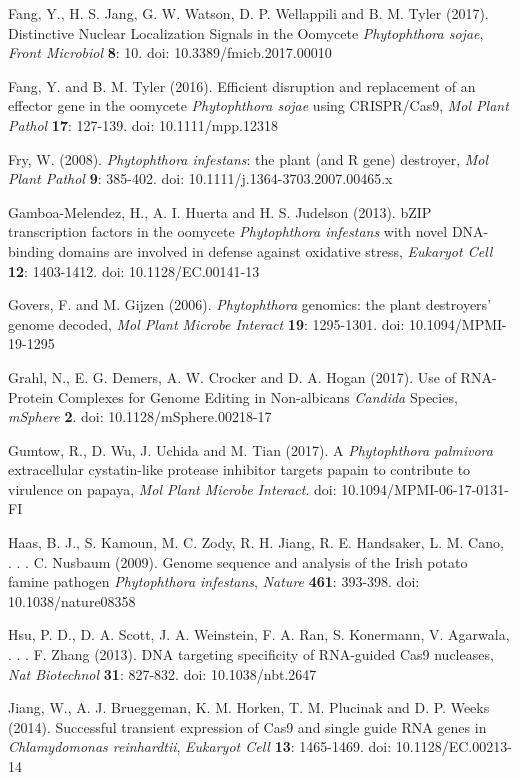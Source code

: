 \documentclass[onecolumn, 11pt,openany]{memoir}
\begin{document}
\begin{multicols}{2}
\begin{sloppy}
\begin{footnotesize}
Fang, Y., H. S. Jang, G. W. Watson, D. P. Wellappili and B. M. Tyler (2017). Distinctive Nuclear Localization Signals in the Oomycete \textit{Phytophthora sojae}, \textit{Front Microbiol} \textbf{8}: 10. doi: 10.3389/fmicb.2017.00010

Fang, Y. and B. M. Tyler (2016). Efficient disruption and replacement of an effector gene in the oomycete \textit{Phytophthora sojae} using CRISPR/Cas9, \textit{Mol Plant Pathol} \textbf{17}: 127-139. doi: 10.1111/mpp.12318

Fry, W. (2008). \textit{Phytophthora infestans}: the plant (and R gene) destroyer, \textit{Mol Plant Pathol} \textbf{9}: 385-402. doi: 10.1111/j.1364-3703.2007.00465.x

Gamboa-Melendez, H., A. I. Huerta and H. S. Judelson (2013). bZIP transcription factors in the oomycete \textit{Phytophthora infestans} with novel DNA-binding domains are involved in defense against oxidative stress, \textit{Eukaryot Cell} \textbf{12}: 1403-1412. doi: 10.1128/EC.00141-13

Govers, F. and M. Gijzen (2006). \textit{Phytophthora }genomics: the plant destroyers' genome decoded, \textit{Mol Plant Microbe Interact} \textbf{19}: 1295-1301. doi: 10.1094/MPMI-19-1295

Grahl, N., E. G. Demers, A. W. Crocker and D. A. Hogan (2017). Use of RNA-Protein Complexes for Genome Editing in Non-albicans \textit{Candida} Species, \textit{mSphere} \textbf{2}. doi: 10.1128/mSphere.00218-17

Gumtow, R., D. Wu, J. Uchida and M. Tian (2017). A \textit{Phytophthora palmivora} extracellular cystatin-like protease inhibitor targets papain to contribute to virulence on papaya, \textit{Mol Plant Microbe Interact}. doi: 10.1094/MPMI-06-17-0131-FI

Haas, B. J., S. Kamoun, M. C. Zody, R. H. Jiang, R. E. Handsaker, L. M. Cano, . . . C. Nusbaum (2009). Genome sequence and analysis of the Irish potato famine pathogen \textit{Phytophthora infestans}, \textit{Nature} \textbf{461}: 393-398. doi: 10.1038/nature08358

Hsu, P. D., D. A. Scott, J. A. Weinstein, F. A. Ran, S. Konermann, V. Agarwala, . . . F. Zhang (2013). DNA targeting specificity of RNA-guided Cas9 nucleases, \textit{Nat Biotechnol} \textbf{31}: 827-832. doi: 10.1038/nbt.2647

Jiang, W., A. J. Brueggeman, K. M. Horken, T. M. Plucinak and D. P. Weeks (2014). Successful transient expression of Cas9 and single guide RNA genes in \textit{Chlamydomonas reinhardtii}, \textit{Eukaryot Cell} \textbf{13}: 1465-1469. doi: 10.1128/EC.00213-14


\end{footnotesize}
\end{sloppy}
\end{multicols}
\end{document}
